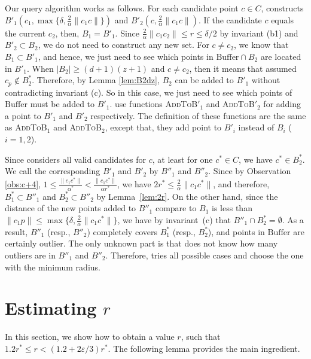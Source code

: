 \documentclass[envcountsame]{cls/cccg15}
\newcommand{\dz}{(d + 1)(z + 1)}
\newcommand{\Buffer}{\ensuremath{\text{Buffer}}}
\newcommand{\textproc}{\textsc}
\newcommand{\len}[1]{\|{#1}\|}
\newcommand{\radius}[1]{\frac{2}{\alpha} \len{c_1 #1}}
\newcommand{\lee}{\leqslant}
\newcommand{\gee}{\geqslant}
\renewcommand{\leq}{\lee}
\renewcommand{\le}{\lee}
\renewcommand{\geq}{\gee}
\newcommand{\eps}{\varepsilon}
\begin{document}
\noindent
Our query algorithm works as follows. 
For each candidate point $c \in C$,  
constructs $B'_1(c_1, \max \{\delta, \radius{c} \})$ and $B'_2(c, \radius{c})$. 
If the candidate $c$ equals the current $c_2$, then, $B_1 = B'_1$. 
Since $\radius{c_2} \leq r \leq \delta/2$ by invariant (b1) and $B'_2 \subset B_2$,
we do not need to construct any new set. 
For $c \neq c_2$, we know that $B_1 \subset B'_1$, and hence,
we just need to see which points in $\Buffer \cap B_2$ are located in $B'_1$.
When $|B_2| \geq \dz$ and $c \neq c_2$, then it means that assumed $c_p \not \in B_2^*$. 
Therefore, by Lemma \ref{lem:B2dz}, $B_2$ can be added to $B'_1$ without contradicting invariant (c). 
So in this case, we just need to see which points of $\Buffer$ must be added to $B'_1$. 
 use functions \textproc{AddToB$'_1$} and \textproc{AddToB$'_2$} for adding a point to $B'_1$ and $B'_2$ respectively. 
The definition of these functions are the same as \textproc{AddToB$_1$} and \textproc{AddToB$_2$},
except that, they add point to $B'_i$ instead of $B_i$ ($i = 1, 2$).

Since  considers all valid candidates for $c$, 
at least for one $c^* \in C$, we have $c^* \in B_2^*$. 
We call the corresponding $B'_1$ and $B'_2$ by $B''_1$ and $B''_2$. 
Since by Observation \ref{obs:c+4},
$1 \leq \frac{\len{c_1 c^*}}{\alpha^*} < \frac{\len {c_1 c^*}}{\alpha r^*}$, 
we have $2r^* \leq \radius{c^*}$, and therefore,
$B^*_1 \subset B''_1$ and $B^*_2 \subset B''_2$ by Lemma~\ref{lem:2r}.
On the other hand, since the distance of the new points added to $B''_1$ compare to $B_1$ is less than $\len{c_1 p} \leq \max \{\delta, \radius{c^*} \}$, 
we have by invariant~(c) that  $B''_1 \cap B_2^* = \emptyset$.
As a result, $B''_1$ (resp., $B''_2$) completely covers $B_1^*$  (resp., $B_2^*$), 
and points in $\Buffer$ are certainly outlier.
The only unknown part is that  does not know how many outliers are in $B''_1$ and $B''_2$.
Therefore,  tries all possible cases and choose the one with the minimum radius.





\section{Estimating $r$}
\label{sec:estimate}

In this section, we show how to obtain a value $r$,
such that $1.2r^* \le r < (1.2 + 2\eps/3)r^*$.
The following lemma provides the main ingredient.
\end{document}
